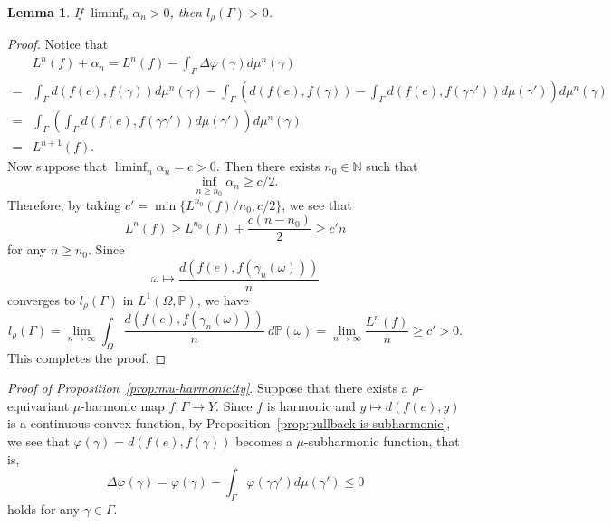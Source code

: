 \documentclass[12pt]{amsart}
\numberwithin{equation}{section}
\theoremstyle{plain}
\newtheorem{Lemma}[Theorem]{Lemma}
\theoremstyle{definition}
\theoremstyle{remark}
\newcommand{\N}{{\mathbb N}}
\begin{document}
\begin{Lemma}
\label{lem:alpha_n}
If $\liminf_n \alpha_n >0$, then $l_{\rho}(\Gamma)>0$. 
\end{Lemma}

\begin{proof}
Notice that 
\begin{equation*}
\begin{split}
 & L^n(f)+ \alpha_n = 
 L^n(f) - \int_{\Gamma} \Delta \varphi(\gamma)
 d\mu^n(\gamma) \\
 = & \int_{\Gamma} d(f(e), f(\gamma)) d\mu^n(\gamma)
 - \int_{\Gamma} \left(d(f(e),f(\gamma)) - 
   \int_{\Gamma} d(f(e), f(\gamma \gamma')) d\mu(\gamma') \right) 
    d\mu^n(\gamma)\\
 = & \int_{\Gamma} \left(\int_{\Gamma} d(f(e), f(\gamma \gamma'))
 d\mu(\gamma')\right) d\mu^n(\gamma) \\
 = & L^{n+1}(f). 
\end{split}
\end{equation*}
Now suppose that $\liminf_n \alpha_n = c>0$. 
Then there exists $n_0 \in \N$ such that
\begin{equation*}
 \inf_{n \geq n_0} \alpha_n \geq c/2. 
\end{equation*}
Therefore, by taking $c'=\min\{ L^{n_0}(f)/n_0, c/2 \}$, we see that
\begin{equation*}
 L^n (f) \geq L^{n_0}(f) + \frac{c(n-n_0)}{2} \geq c'n
\end{equation*}
for any $n\geq n_0$. 
Since 
\begin{equation*}
 \omega \mapsto \frac{d(f(e), f(\gamma_n(\omega)))}{n}
\end{equation*}
converges to $l_{\rho}(\Gamma)$ in $L^1(\Omega, \mathbb{P})$, 
we have 
\begin{equation*}
 l_{\rho}(\Gamma) 
 = \lim_{n\to \infty} \int_{\Omega}\frac{d(f(e),f(\gamma_n(\omega)))}{n}
 \ d\mathbb{P}(\omega)
 = \lim_{n\to \infty} \frac{L^n(f)}{n} \geq c'>0. 
\end{equation*}
This completes the proof. 
\end{proof}

\medskip

\noindent
{\it Proof of Proposition~\ref{prop:mu-harmonicity}}. 
Suppose that there exists a
$\rho$-equivariant $\mu$-harmonic map $f \colon \Gamma \rightarrow Y$. 
Since $f$ is harmonic and $y \mapsto d(f(e),y)$ is a continuous convex
function, by Proposition~\ref{prop:pullback-is-subharmonic}, we see that 
$\varphi(\gamma)=d(f(e),f(\gamma))$ becomes a 
$\mu$-subharmonic function, that is, 
\begin{equation*}
 \Delta \varphi(\gamma) 
 = \varphi(\gamma) - \int_{\Gamma}
 \varphi(\gamma \gamma') d\mu(\gamma') \leq 0
\end{equation*}
holds for any $\gamma \in \Gamma$.  
\end{document}
